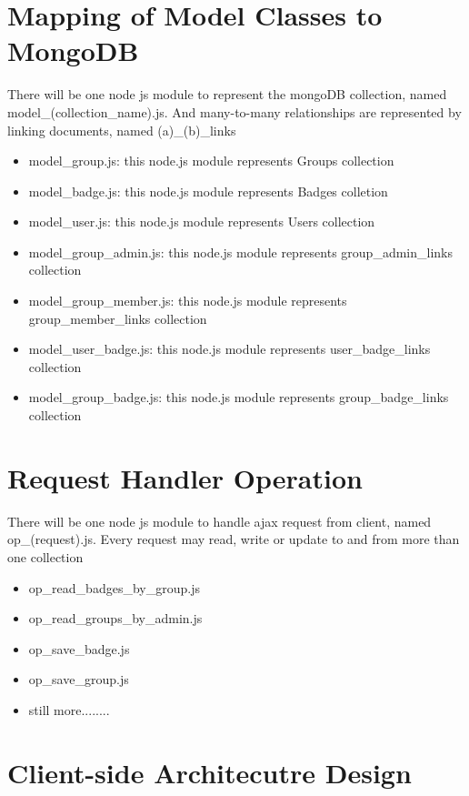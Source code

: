 \section{Mapping of Model Classes to MongoDB}
There will be one node js module to represent the mongoDB collection, named model{\_}(collection{\_}name).js. And many-to-many relationships are represented by linking documents, named (a){\_}(b){\_}links

\begin{itemize}
\item model{\_}group.js: this node.js module represents Groups collection
\item model{\_}badge.js: this node.js module represents Badges colletion
\item model{\_}user.js: this node.js module represents Users collection
\item model{\_}group{\_}admin.js: this node.js module represents group{\_}admin{\_}links collection
\item model{\_}group{\_}member.js: this node.js module represents group{\_}member{\_}links collection
\item model{\_}user{\_}badge.js: this node.js module represents user{\_}badge{\_}links collection
\item model{\_}group{\_}badge.js: this node.js module represents group{\_}badge{\_}links collection
\end{itemize}

\section{Request Handler Operation}
There will be one node js module to handle ajax request from client, named op{\_}(request).js. Every request may read, write or update to and from more than one collection

\begin{itemize}
\item op{\_}read{\_}badges{\_}by{\_}group.js
\item op{\_}read{\_}groups{\_}by{\_}admin.js
\item op{\_}save{\_}badge.js
\item op{\_}save{\_}group.js
\item still more........
\end{itemize}

\section{Client-side Architecutre Design}


